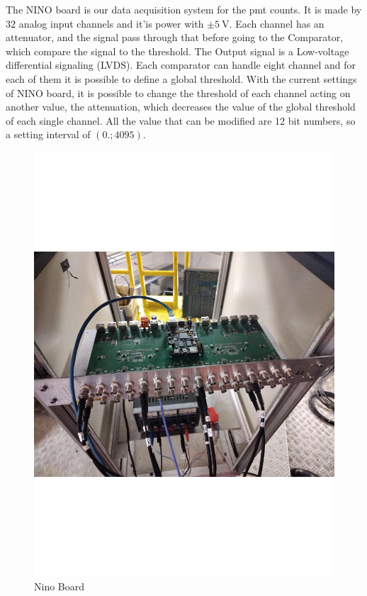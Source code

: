 The NINO board is our data acquisition system for the pmt counts. It is made by $32$ analog input channels and it'is power with $\pm \SI{5}{\volt}$. Each channel has an attenuator, and the signal pass through that before going to the Comparator, which compare the signal to the threshold. The Output signal is a Low-voltage differential signaling (LVDS). Each comparator can handle eight channel and for each of them it is possible to define a global threshold. With the current settings of NINO board, it is possible to change the threshold of each channel acting on another value, the attenuation, which decreases the value of the global threshold of each single channel. All the value that can be modified are 12 bit numbers, so a setting interval of $(0. ; 4095)$.

\begin{figure}[hbtp]
 
 \centering
 \includegraphics[scale= 0.4]{figures/NINO.pdf}
 \caption{Nino Board}
 \label{fig:NinoBoard}
 \end{figure}

